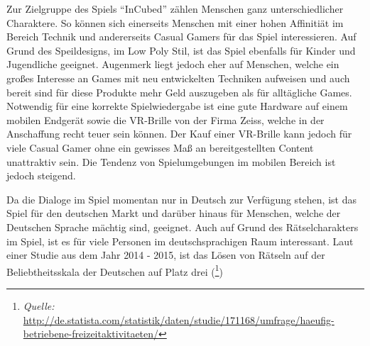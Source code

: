 
Zur Zielgruppe des Spiels “InCubed” zählen Menschen ganz unterschiedlicher Charaktere. So können sich einerseits Menschen mit einer hohen Affinitiät im Bereich Technik und andererseits Casual Gamers für das Spiel interessieren. Auf Grund des Speildesigns, im Low Poly Stil, ist das Spiel ebenfalls für Kinder und Jugendliche geeignet. Augenmerk liegt jedoch eher auf Menschen, welche ein großes Interesse an Games mit neu entwickelten Techniken aufweisen und auch bereit sind für diese Produkte mehr Geld auszugeben als für alltägliche Games. Notwendig für eine korrekte Spielwiedergabe ist eine gute Hardware auf einem mobilen Endgerät sowie die VR-Brille von der Firma Zeiss, welche in der Anschaffung recht teuer sein können. Der Kauf einer VR-Brille kann jedoch für viele Casual Gamer ohne ein gewisses Maß an bereitgestellten Content unattraktiv sein. Die Tendenz von Spielumgebungen im mobilen Bereich ist jedoch steigend.

Da die Dialoge im Spiel momentan nur in Deutsch zur Verfügung stehen, ist das Spiel für den deutschen Markt und darüber hinaus für Menschen, welche der Deutschen Sprache mächtig sind, geeignet. Auch auf Grund des Rätselcharakters im Spiel, ist es für viele Personen im deutschsprachigen Raum interessant. Laut einer Studie aus dem Jahr 2014 - 2015, ist das Lösen von Rätseln auf der Beliebtheitsskala der Deutschen auf Platz drei (\footnote{\textit{Quelle:} \url{http://de.statista.com/statistik/daten/studie/171168/umfrage/haeufig-betriebene-freizeitaktivitaeten/}})
